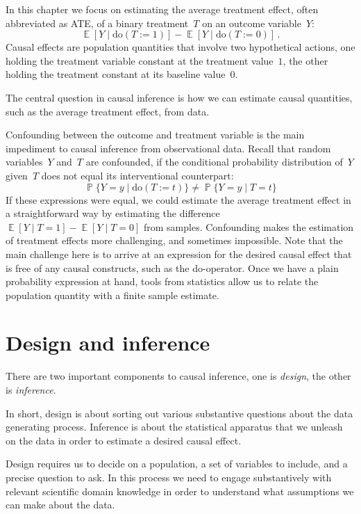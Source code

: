 \documentclass{tufte-book}
\begin{document}
In this chapter we focus on estimating the average treatment effect,
often abbreviated as ATE, of a binary treatment~\(T\) on an outcome
variable~\(Y\): \[
\mathop\mathbb{E}[Y \mid \mathrm{do}(T:=1) ] - \mathop\mathbb{E}[Y \mid \mathrm{do}(T:=0)]\,.
\] Causal effects are population quantities that involve two
hypothetical actions, one holding the treatment variable constant at the
treatment value~\(1\), the other holding the treatment constant at its
baseline value~\(0\).

The central question in causal inference is how we can estimate causal
quantities, such as the average treatment effect, from data.

Confounding between the outcome and treatment variable is the main
impediment to causal inference from observational data. Recall that
random variables~\(Y\) and~\(T\) are confounded, if the conditional
probability distribution of~\(Y\) given~\(T\) does not equal its
interventional counterpart: \[
\mathop\mathbb{P}\{Y=y\mid \mathrm{do}(T:=t)\}
\ne
\mathop\mathbb{P}\{Y=y\mid T=t\}
\] If these expressions were equal, we could estimate the average
treatment effect in a straightforward way by estimating the difference
\(\mathop\mathbb{E}[Y\mid T=1]-\mathop\mathbb{E}[Y\mid T=0]\) from
samples. Confounding makes the estimation of treatment effects more
challenging, and sometimes impossible. Note that the main challenge here
is to arrive at an expression for the desired causal effect that is free
of any causal constructs, such as the do-operator. Once we have a plain
probability expression at hand, tools from statistics allow us to relate
the population quantity with a finite sample estimate.

\hypertarget{design-and-inference}{%
\section{Design and inference}\label{design-and-inference}}

There are two important components to causal inference, one is
\emph{design}, the other is \emph{inference}.

In short, design is about sorting out various substantive questions
about the data generating process. Inference is about the statistical
apparatus that we unleash on the data in order to estimate a desired
causal effect.

Design requires us to decide on a population, a set of variables to
include, and a precise question to ask. In this process we need to
engage substantively with relevant scientific domain knowledge in order
to understand what assumptions we can make about the data.
\end{document}
